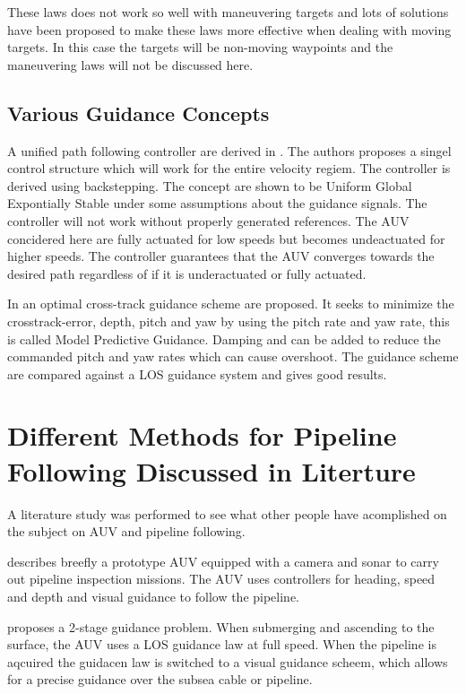         These laws does not work so well with maneuvering targets and lots of solutions have been proposed
	to make these laws more effective when dealing with moving targets. In this case the targets will be
	non-moving waypoints and the maneuvering laws will not be discussed here.
	
	
	\subsection{Various Guidance Concepts}
		A unified path following controller are derived in \cite{control-concept-AUV}. The 
		authors proposes a singel control structure which will work for the entire velocity regiem.
		The controller is derived using backstepping. The concept are shown to be Uniform Global
		Expontially Stable under some assumptions about the guidance signals. The controller will not
		work without properly generated references. The AUV concidered here are fully actuated for low
		speeds but becomes undeactuated for higher speeds. The controller guarantees that the AUV
		converges towards the desired path regardless of if it is underactuated or fully actuated.
		
		In \cite{optimal-cross-track} an optimal cross-track guidance scheme are proposed. It seeks to minimize
		the crosstrack-error, depth, pitch and yaw by using the pitch rate and yaw rate, this is called Model
		Predictive Guidance. Damping and can be added to reduce the commanded pitch and yaw rates which can
		cause overshoot. The guidance scheme are compared against a LOS guidance system and gives good
		results.

	
\section{Different Methods for Pipeline Following Discussed in Literture}
	A literature study was performed to see what other people have acomplished on the subject on AUV and 
	pipeline following. 

	\cite{piscis} describes breefly a prototype AUV equipped with a camera and sonar to carry out pipeline
	inspection missions. The AUV uses controllers for heading, speed and depth and visual guidance to
	follow the pipeline. 
	
	\cite{GuidanceReview} proposes a 2-stage guidance problem. When submerging and ascending to the surface, 
	the AUV uses a LOS guidance law at full speed. When the pipeline is aqcuired the guidacen law is switched 
	to a visual guidance scheem, which allows for a precise guidance over the subsea cable or pipeline. 
		
